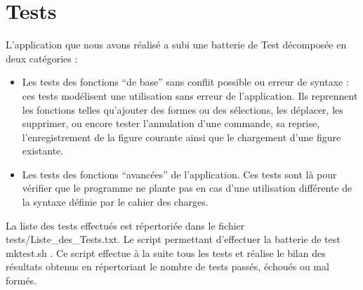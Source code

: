 \documentclass[12pt]{article}
\begin{document}
\section{Tests}
L’application que nous avons réalisé a subi une batterie de Test décomposée en deux catégories :
\begin{itemize}
\item Les tests des fonctions “de base” sans conflit possible ou erreur de syntaxe : ces tests modélisent une utilisation sans erreur de l’application. Ils reprennent les fonctions telles qu’ajouter des formes ou des sélections, les déplacer, les supprimer, ou encore tester l’annulation d’une commande, sa reprise, l’enregistrement de la figure courante ainsi que le chargement d’une figure existante.
\item Les tests des fonctions “avancées” de l’application. Ces tests sont là pour vérifier que le programme ne plante pas en cas d’une utilisation différente de la syntaxe définie par le cahier des charges.
\end{itemize}
La liste des tests effectués est répertoriée dans le fichier tests/Liste\_des\_Tests.txt. Le script permettant d’effectuer la batterie de test mktest.sh . Ce script effectue à la suite tous les tests et réalise le bilan des résultats obtenus en répertoriant le nombre de tests passés, échoués ou mal formés.
\end{document}

